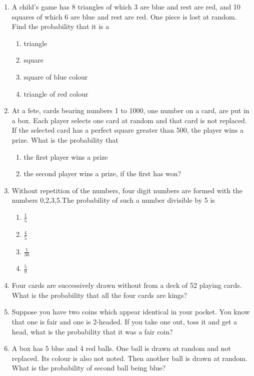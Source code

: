 \begin{enumerate}
\item A child's game has 8 triangles of which 3 are blue and rest are red, and 10 squares of which 6 are blue and rest are red. One piece is lost at random. Find the probability that it is a
\begin{enumerate}
\item triangle 
\item square 
\item square of blue colour 
\item triangle of red colour           
\end{enumerate}
\solution
%
\item At a fete, cards bearing numbers 1 to 1000, one number on a card, are put in a box. Each player selects one card at random and that card is not replaced. If the selected card has a perfect square greater than 500, the player wins a prize. What is the probability that 
\begin{enumerate}
\item the first player wins a prize
\item the second player wins a prize, if the first has won?
\end{enumerate}
\solution
%
\item Without repetition of the numbers, four digit numbers are formed with the numbers 0,2,3,5.The
probability of such a number divisible by 5 is
\begin{enumerate}
\item $\frac{1}{5}$ 
\item $\frac{4}{5}$
\item $\frac{1}{30}$ 
\item $\frac{5}{9}$
\end{enumerate}
\solution
%
\item Four cards are successively drawn without from a deck of 52 playing cards. What is the probability that all the four cards are kings?
\\
%
\item Suppose you have two coins which appear identical in your pocket. You know
that one is fair and one is 2-headed. If you take one out, toss it and get a head,
what is the probability that it was a fair coin?
\\
%
\item A box has 5 blue and 4 red balls. One ball is drawn at random and not replaced. Its colour is also not noted. Then another ball is drawn at random. What is the probability of second ball being blue?

\end{enumerate}
